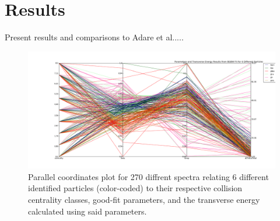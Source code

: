 \chapter{Results} \label{ch:results}
Present results and comparisons to Adare et al.....

	\begin{figure}[h]
	  \centering
	  \includegraphics[width=6.5in]{figures/parallelCoordPlot_4Axes.png}
	  \caption{Parallel coordinates plot for 270 diffrent spectra relating 6 different identified particles (color-coded) to their respective collision centrality classes, good-fit parameters, and the transverse energy calculated using said parameters.\cite{2007PhRvL..98p2301A}}\label{fig:parallelCoord}
	\end{figure}

